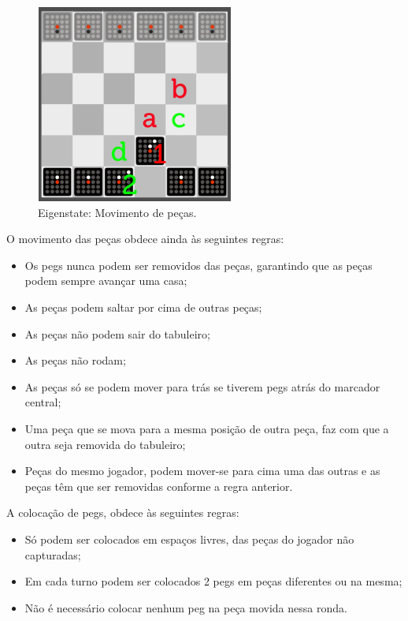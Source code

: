 \documentclass[paper=a4, fontsize=11pt]{scrartcl} %
\numberwithin{equation}{section} %
\numberwithin{figure}{section} %
\numberwithin{table}{section} %
\begin{document}
\begin{figure}[tb]
	\centering
	\includegraphics{eigenstate_moves}
	\caption[Eigenstate: Movimento das peças.]{Eigenstate: Movimento de peças. \cite{eigenstaterules:2018}} %
	\label{fig:eigenstatemoves} 
\end{figure}

O movimento das peças obdece ainda às seguintes regras:

\begin{itemize}
	\item Os pegs nunca podem ser removidos das peças, garantindo que as peças podem sempre avançar uma casa;
	\item As peças podem saltar por cima de outras peças;
	\item As peças não podem sair do tabuleiro;
	\item As peças não rodam;
	\item As peças só se podem mover para trás se tiverem pegs atrás do marcador central;
	\item Uma peça que se mova para a mesma posição de outra peça, faz com que a outra seja removida do tabuleiro;
	\item Peças do mesmo jogador, podem mover-se para cima uma das outras e as peças têm que ser removidas conforme a regra anterior.
\end{itemize}

A colocação de pegs, obdece às seguintes regras:

\begin{itemize}
	\item Só podem ser colocados em espaços livres, das peças do jogador não capturadas;
	\item Em cada turno podem ser colocados 2 pegs em peças diferentes ou na mesma;
	\item Não é necessário colocar nenhum peg na peça movida nessa ronda.
\end{itemize}
\end{document}
